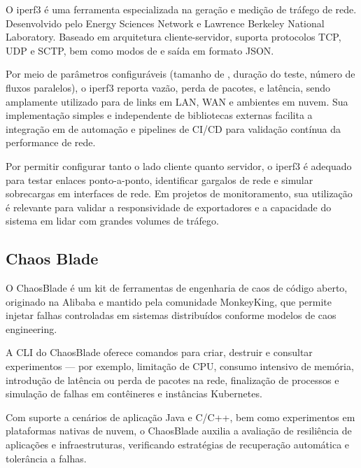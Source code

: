 {\color{red}

O iperf3 \citep{iperf32025} é uma ferramenta especializada na geração e medição de tráfego de rede. Desenvolvido pelo Energy Sciences Network e Lawrence Berkeley National Laboratory. Baseado em arquitetura cliente-servidor, suporta protocolos TCP, UDP e SCTP, bem como modos de  e saída em formato JSON.

Por meio de parâmetros configuráveis (tamanho de , duração do teste, número de fluxos paralelos), o iperf3 reporta vazão, perda de pacotes,  e latência, sendo amplamente utilizado para  de links em LAN, WAN e ambientes em nuvem. Sua implementação simples e independente de bibliotecas externas facilita a integração em  de automação e pipelines de CI/CD para validação contínua da performance de rede.

Por permitir configurar tanto o lado cliente quanto servidor, o iperf3 é adequado para testar enlaces ponto-a-ponto, identificar gargalos de rede e simular sobrecargas em interfaces de rede. Em projetos de monitoramento, sua utilização é relevante para validar a responsividade de exportadores e a capacidade do sistema em lidar com grandes volumes de tráfego.
    

}

\subsection{Chaos Blade}
\label{subsection:ChaosBlade}

{\color{red}

O ChaosBlade \citep{chaosblade2025} é um kit de ferramentas de engenharia de caos de código aberto, originado na Alibaba e mantido pela comunidade MonkeyKing, que permite injetar falhas controladas em sistemas distribuídos conforme modelos de caos engineering.

A CLI do ChaosBlade oferece comandos para criar, destruir e consultar experimentos — por exemplo, limitação de CPU, consumo intensivo de memória, introdução de latência ou perda de pacotes na rede, finalização de processos e simulação de falhas em contêineres e instâncias Kubernetes.

Com suporte a cenários de aplicação Java e C/C++, bem como experimentos em plataformas nativas de nuvem, o ChaosBlade auxilia a avaliação de resiliência de aplicações e infraestruturas, verificando estratégias de recuperação automática e tolerância a falhas.
    

}

